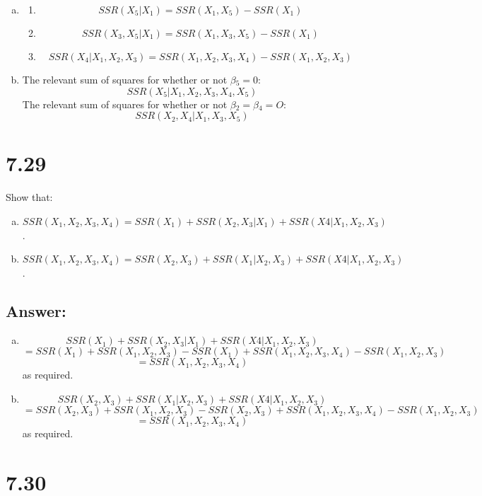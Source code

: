 \documentclass{article}
\begin{document}
\begin{enumerate}[a)]
\item{}
\begin{enumerate}[1)]
\item{} $$ SSR(X_5|X_1) = SSR(X_1,X_5) - SSR(X_1) $$
\item{} $$ SSR(X_3,X_5|X_1) = SSR(X_1,X_3,X_5) - SSR(X_1) $$
\item{} $$ SSR(X_4|X_1,X_2,X_3) = SSR(X_1,X_2,X_3,X_4) - SSR(X_1,X_2,X_3) $$
\end{enumerate}
\item{} The relevant sum of squares for whether or not $\beta{}_5 = 0$:
$$ SSR(X_5|X_1,X_2,X_3,X_4,X_5) $$
The relevant sum of squares for whether or not $\beta{}_2 = \beta{}_4 = O$:
$$ SSR(X_2,X_4|X_1,X_3,X_5) $$
\end{enumerate}

\section{7.29}

Show that:
\begin{enumerate}[a)]
\item{} $SSR(X_1,X_2,X_3,X_4) = SSR(X_1) + SSR(X_2,X_3|X_1) + SSR(X4|X_1,X_2,X_3)$.
\item{} $SSR(X_1,X_2,X_3,X_4) = SSR(X_2,X_3) + SSR(X_1|X_2,X_3) + SSR(X4|X_1,X_2,X_3)$.
\end{enumerate}

\subsection{Answer:}

\begin{enumerate}[a)]
\item{} $$ SSR(X_1) + SSR(X_2,X_3|X_1) + SSR(X4|X_1,X_2,X_3) $$
$$ = SSR(X_1) + SSR(X_1,X_2,X_3) - SSR(X_1) + SSR(X_1,X_2,X_3,X_4) - SSR(X_1,X_2,X_3) $$
$$ = SSR(X_1,X_2,X_3,X_4) $$
as required.
\item{} $$ SSR(X_2,X_3) + SSR(X_1|X_2,X_3) + SSR(X4|X_1,X_2,X_3) $$
$$ = SSR(X_2,X_3) + SSR(X_1,X_2,X_3) - SSR(X_2,X_3) + SSR(X_1,X_2,X_3,X_4) - SSR(X_1,X_2,X_3) $$
$$ = SSR(X_1,X_2,X_3,X_4) $$
as required.
\end{enumerate}

\section{7.30}
\end{document}
